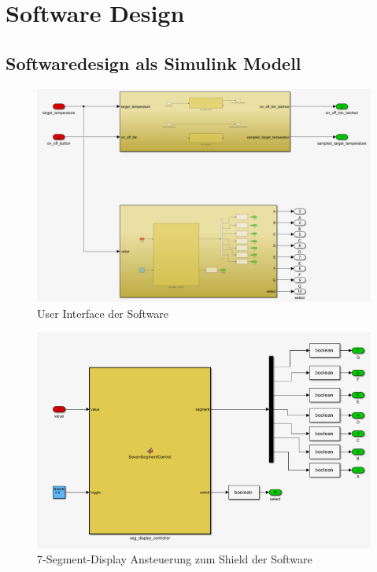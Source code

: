 \documentclass[a4paper,12pt]{article}
\begin{document}
	\newpage
	
	\section{Software Design}
	
	\subsection{Softwaredesign als Simulink Modell}
	
	
	
	\begin{figure}[h!]
		\centering
		\includegraphics[width=\textwidth]{user_interface.png}
		\caption{User Interface der Software}
	\end{figure}
	\newpage
	\begin{figure}[h!]
		\centering
		\includegraphics[width=\textwidth]{segment_display.png}
		\caption{7-Segment-Display Ansteuerung zum Shield der Software}
	\end{figure}
\end{document}
